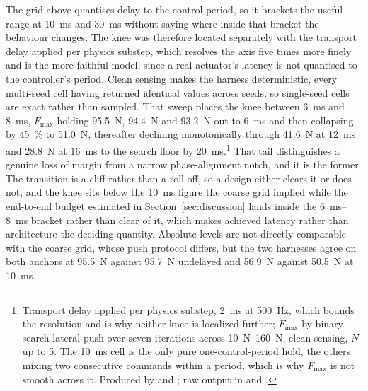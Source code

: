 \documentclass[a4paper,fleqn]{cas-dc}
\begin{document}
The grid above quantises delay to the control period, so it brackets the useful
range at \SI{10}{ms} and \SI{30}{ms} without saying where inside that bracket the
behaviour changes. The knee was therefore located separately with the transport
delay applied per physics substep, which resolves the axis five times more finely
and is the more faithful model, since a real actuator's latency is not quantised
to the controller's period. Clean sensing makes the harness deterministic, every
multi-seed cell having returned identical values across seeds, so single-seed
cells are exact rather than sampled. That sweep places the knee between \SI{6}{ms}
and \SI{8}{ms}, $F_{\max}$ holding \SI{95.5}{N}, \SI{94.4}{N} and
\SI{93.2}{N} out to \SI{6}{ms} and then collapsing by \SI{45}{\percent} to
\SI{51.0}{N}, thereafter declining monotonically through \SI{41.6}{N} at
\SI{12}{ms} and \SI{28.8}{N} at \SI{16}{ms} to the search floor by
\SI{20}{ms}.\footnote{Transport delay applied per physics substep, \SI{2}{ms} at
\SI{500}{Hz}, which bounds the resolution and is why neither knee is localized
further; $F_{\max}$ by binary-search lateral push over seven iterations across
\SIrange{10}{160}{N}, clean sensing, $N$ up to \num{5}. The \SI{10}{ms} cell is
the only pure one-control-period hold, the others mixing two consecutive
commands within a period, which is why $F_{\max}$ is not smooth across it.
Produced by  and
; raw output in
 and .} That tail distinguishes a genuine loss of margin from a
narrow phase-alignment notch, and it is the former. The transition is a cliff
rather than a roll-off, so a design either clears it or does not, and the knee
sits below the \SI{10}{ms} figure the coarse grid implied while the end-to-end
budget estimated in Section~\ref{sec:discussion} lands inside the
\SIrange{6}{8}{ms} bracket rather than clear of it, which makes achieved latency
rather than architecture the deciding quantity. Absolute levels are not directly
comparable with the coarse grid, whose push protocol differs, but the
two harnesses agree on both anchors at \SI{95.5}{N} against \SI{95.7}{N}
undelayed and \SI{56.9}{N} against \SI{50.5}{N} at \SI{10}{ms}.
\end{document}
